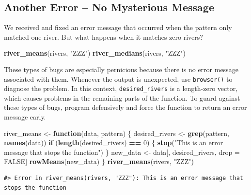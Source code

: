 \documentclass[
]{book}
\newenvironment{Shaded}{\begin{snugshade}}{\end{snugshade}}
\newcommand{\ControlFlowTok}[1]{\textcolor[rgb]{0.13,0.29,0.53}{\textbf{#1}}}
\newcommand{\DecValTok}[1]{\textcolor[rgb]{0.00,0.00,0.81}{#1}}
\newcommand{\KeywordTok}[1]{\textcolor[rgb]{0.13,0.29,0.53}{\textbf{#1}}}
\newcommand{\NormalTok}[1]{#1}
\newcommand{\OperatorTok}[1]{\textcolor[rgb]{0.81,0.36,0.00}{\textbf{#1}}}
\newcommand{\OtherTok}[1]{\textcolor[rgb]{0.56,0.35,0.01}{#1}}
\newcommand{\StringTok}[1]{\textcolor[rgb]{0.31,0.60,0.02}{#1}}
\begin{document}
\hypertarget{another-error-no-mysterious-message}{%
\subsection{Another Error -- No Mysterious Message}\label{another-error-no-mysterious-message}}

We received and fixed an error message that occurred when the pattern only matched one river. But what happens when it matches zero rivers?

\begin{Shaded}
\begin{Highlighting}[]
\KeywordTok{river_means}\NormalTok{(rivers, }\StringTok{"ZZZ"}\NormalTok{)}
\KeywordTok{river_medians}\NormalTok{(rivers, }\StringTok{"ZZZ"}\NormalTok{)}
\end{Highlighting}
\end{Shaded}

These types of bugs are especially pernicious because there is no error message associated with them. Whenever the output is unexpected, use \texttt{browser()} to diagnose the problem. In this context, \texttt{desired\_rivers} is a length-zero vector, which causes problems in the remaining parts of the function. To guard against these types of bugs, program defensively and force the function to return an error message early.

\begin{Shaded}
\begin{Highlighting}[]
\NormalTok{river_means <-}\StringTok{ }\ControlFlowTok{function}\NormalTok{(data, pattern) \{}
\NormalTok{  desired_rivers <-}\StringTok{ }\KeywordTok{grep}\NormalTok{(pattern, }\KeywordTok{names}\NormalTok{(data))}
  \ControlFlowTok{if}\NormalTok{ (}\KeywordTok{length}\NormalTok{(desired_rivers) }\OperatorTok{==}\StringTok{ }\DecValTok{0}\NormalTok{) \{}
    \KeywordTok{stop}\NormalTok{(}\StringTok{"This is an error message that stops the function"}\NormalTok{)}
\NormalTok{  \}}
\NormalTok{  new_data <-}\StringTok{ }\NormalTok{data[, desired_rivers, drop =}\StringTok{ }\OtherTok{FALSE}\NormalTok{]}
  \KeywordTok{rowMeans}\NormalTok{(new_data)}
\NormalTok{\}}
\KeywordTok{river_means}\NormalTok{(rivers, }\StringTok{"ZZZ"}\NormalTok{)}
\end{Highlighting}
\end{Shaded}

\begin{verbatim}
#> Error in river_means(rivers, "ZZZ"): This is an error message that stops the function
\end{verbatim}
\end{document}
